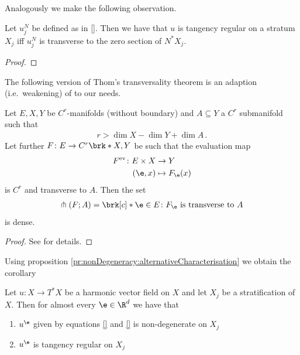 Analogously we make the following observation.
\begin{proposition}
  Let $u^N_j$ be defined as in \ref{}.
  Then we have that $u$ is tangency regular on a stratum $X_j$ iff
   $u^N_j$ is transverse to the zero section of $N^*X_j$.
\end{proposition}
\begin{proof}
\end{proof}
The following version of Thom's transversality theorem is an adaption (i.e.\ weakening) of \cite[Theorem 2.7]{Hirsch1994} to our needs.
\begin{theorem}
  Let $E,X,Y$ be $C^r$-manifolds (without boundary) and $A\subseteq Y$ a $C^r$ submanifold such that
  \begin{align*}
    r>\dim X-\dim Y+\dim A\,.
  \end{align*}
  Let further $F\colon E\to C^r\brk*{X,Y}$ be such that the evaluation map
  \begin{align*}
    F^\text{ev}\colon E\times X&\to Y \\
    (\e,x)&\mapsto F_\e(x)
  \end{align*}
  is $C^r$ and transverse to $A$.
  Then the set
  \begin{align*}
    \pitchfork(F;A)=\brk[c]*{\e\in E\colon F_\e\text{ is transverse to } A}
  \end{align*}
  is dense.
\end{theorem}
\begin{proof}
  See \cite[Theorem 2.7]{Hirsch1994} for details.
\end{proof}
Using proposition \ref{pr:nonDegeneracy:alternativeCharacterisation} we obtain the corollary
\begin{corollary}
  Let $u\colon X\to T^*X$ be a harmonic vector field on $X$ and let $X_j$ be a stratification of $X$.
   Then for almost every $\e\in\R^d$ we have that
  \begin{enumerate}
    \item $u^\e$ given by equations \eqref{} and \eqref{} is non-degenerate on $X_j$ \label{co:nonDegeneracy_density_nonDeg}
    \item $u^\e$ is tangency regular on $X_j$ \label{co:nonDegeneracy_density_tanReg}
  \end{enumerate}
\end{corollary}

